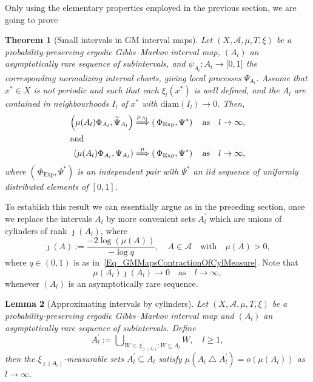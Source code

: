 \documentclass[10pt]{amsart}
\newtheorem{theo}{Theorem}[section]
\newtheorem{lemm}[theo]{Lemma}\newtheorem{prop}[theo]{Proposition}\newtheorem{coro}[theo]{Corollary}\newtheorem{conj}[theo]{Conjecture}
\theoremstyle{definition}\newtheorem{defi}[theo]{Definition}\newtheorem{rema}[theo]{Remark}\newtheorem{exam}[theo]{Example}\newtheorem{exem}[theo]{Example}\newtheorem{nota}[theo]{Notation}
\newcommand{\clA}{\mathcal{A}}
\newcommand{\Expl}{\mathrm{Exp}}
\newcommand{\diam}{\mathrm{diam}}
\begin{document}
Only using the elementary properties employed in the previous section, we are going to prove

\begin{theo}[{Small intervals in GM interval maps}]\label{T_WhenWhereGMIntervalMaps}
Let $(X,\clA,\mu,T,\xi)$ be a probability-preserving ergodic Gibbs--Markov interval map, $(A_{l})$ an asymptotically rare sequence of subintervals, and $\psi_{A_{l}}:A_{l}
\rightarrow\lbrack0,1]$ the corresponding normalizing interval charts, giving local processes $\Psi_{A_{l}}$. Assume that $x^{\ast}\in X$ is not periodic and such that each $\xi_{l}(x^{\ast})$ is well defined, and the $A_{l}$ are contained in neighbourhoods $I_{l}$ of $x^{\ast}$ with $\diam (I_{l})\rightarrow0$. Then,
\begin{align}
\left(\mu(A_{l})\Phi_{A_{l}},\widetilde{\Psi}_{A_{l}}\right)&\overset{\mu_{A_{l}} }{\Longrightarrow}\left(\,\Phi_{\Expl},\Psi^{\ast}\right)\quad\text{as}\quad l\rightarrow\infty,
\\
\intertext{and}
\left(\mu(A_{l})\Phi_{A_{l}},\Psi_{A_{l}}\right) &\overset{\mu}{\Longrightarrow} \left(\,\Phi_{\Expl},\Psi^{\ast}\right)\quad\text{as}\quad l\rightarrow\infty,
\end{align}
where $(\,\Phi_{\Expl},\Psi^{\ast})$ is an independent pair with $\Psi^{\ast}$ an iid sequence of uniformly distributed elements of $[0,1]$.
\end{theo}

To establish this result we can essentially argue as in the preceding section, once we replace the intervals $A_{l}$ by more convenient sets $A_{l}^{\prime}$ which are unions of cylinders of rank $\jmath(A_{l})$, where
\begin{equation}\label{Eq_DefRankFunctionJ}
\jmath(A):=\frac{-2\log(\mu(A))}{-\log q}, \quad A\in\clA\quad\text{with}\quad \mu(A)>0, 
\end{equation}
where $q\in(0,1)$ is as in~\eqref{Eq_GMMapsContractionOfCylMeasure}. Note that
\begin{equation}\label{Eq_mkhmnzknmznmznmz}
\mu(A_{l})\jmath(A_{l})\longrightarrow0 \quad\text{as} \quad l\rightarrow
\infty, 
\end{equation}
whenever $(A_{l})$ is an asymptotically rare sequence.

\begin{lemm}[{Approximating intervals by cylinders}]\label{L_ApproxByCyls}
Let $(X,\clA,\mu,T,\xi)$ be a probability-preserving ergodic Gibbs--Markov interval map and $(A_{l})$ an asymptotically rare sequence of subintervals. Define
\begin{equation}
A_{l}^{\prime}:= {\textstyle\bigcup\nolimits_{W\,\in\,\xi_{\jmath(A_{l})}:W\subseteq A_{l}}} W, \quad l\geq1,
\end{equation}
then the $\xi_{\jmath(A_{l})}$-measurable sets $A_{l}^{\prime}\subseteq A_{l}$ satisfy $\mu(A_{l}\bigtriangleup A_{l}^{\prime})=o(\mu(A_{l}))$ as $l\rightarrow\infty$.
\end{lemm}
\end{document}
